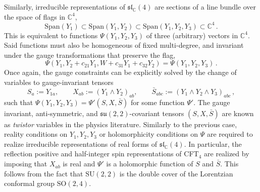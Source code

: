 \documentclass{article}
\def \Cs {\mathbb{C}}
\begin{document}
Similarly, irreducible representations of $\mathfrak{sl}_{\Cs}(4)$ are sections of a line bundle over the space of flags in $\Cs^4$,
\begin{equation}
    \mathrm{Span}(Y_1) \subset  \mathrm{Span}(Y_1,Y_2) \subset  \mathrm{Span}(Y_1,Y_2,Y_3) \subset \Cs^4\,.
\end{equation}
This is equivalent to functions $\Psi(Y_1,Y_2,Y_3)$ of three (arbitrary) vectors in $\Cs^4$. Said functions must also be homogeneous of fixed multi-degree, and invariant under the gauge transformations that preserve the flag,
\begin{equation}
\Psi(Y_1, Y_2+c_{21} Y_1,W+c_{31} Y_1 + c_{32} Y_2) = \Psi(Y_1,Y_2,Y_3)\,. 
\end{equation}
Once again, the gauge constraints can be explicitly solved by the change of variables to gauge-invariant tensors 
\begin{equation}
S_a := Y_{1a}, \qquad X_{ab} := (Y_1\wedge Y_2)_{ab}, \qquad  \bar{S}_{abc} := (Y_1 \wedge Y_2\wedge Y_3)_{abc}\,,
\label{flag_to_twistor}
\end{equation}
such that $\Psi(Y_1,Y_2,Y_3) = \Psi'(S,X,\bar{S})$ for some function $\Psi'$. The gauge invariant, anti-symmetric, and $\mathfrak{su}(2,2)$-covariant tensors $(S,X,\bar{S})$ are known as \emph{twistor} variables in the physics literature. Similarly to the previous case, reality conditions on $Y_1,Y_2,Y_3$ or holomorphicity conditions on $\Psi$ are required to realize irreducible representations of real forms of $\mathfrak{sl}_{\Cs}(4)$. In particular, the reflection positive and half-integer spin representations of CFT$_4$ are realized by imposing that $X_{ab}$ is real and $\Psi'$ is a holomorphic function of $S$ and $\bar{S}$. This follows from the fact that $\mathrm{SU}(2,2)$ is the double cover of the Lorentzian conformal group $\mathrm{SO}(2,4)$.
\end{document}
